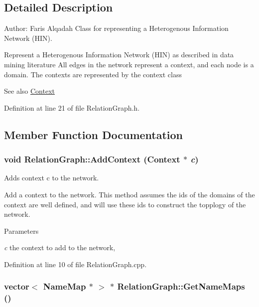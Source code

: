 \subsection{Detailed Description}
Author: Faris Alqadah Class for representing a Heterogenous Information Network (HIN).

Represent a Heterogenous Information Network (HIN) as described in data mining literature All edges in the network represent a context, and each node is a domain. The contexts are represented by the context class

\begin{DoxySeeAlso}{See also}
\hyperlink{class_context}{Context} 
\end{DoxySeeAlso}


Definition at line 21 of file RelationGraph.h.



\subsection{Member Function Documentation}
\hypertarget{class_relation_graph_a5c1bd71649ec9c19f28b3fe0abda9540}{
\subsubsection[{AddContext}]{\setlength{\rightskip}{0pt plus 5cm}void RelationGraph::AddContext ({\bf Context} $\ast$ {\em c})}}
\label{class_relation_graph_a5c1bd71649ec9c19f28b3fe0abda9540}


Adds context c to the network. 

Add a context to the network. This method assumes the ids of the domains of the context are well defined, and will use these ids to construct the topplogy of the network. 
\begin{DoxyParams}{Parameters}
\item[{\em c}]the context to add to the network, \end{DoxyParams}


Definition at line 10 of file RelationGraph.cpp.

\hypertarget{class_relation_graph_a79d93b2f1cb9226aa4a3fcbbe423588b}{
\subsubsection[{GetNameMaps}]{\setlength{\rightskip}{0pt plus 5cm}vector$<$ {\bf NameMap} $\ast$ $>$ $\ast$ RelationGraph::GetNameMaps ()}}
\label{class_relation_graph_a79d93b2f1cb9226aa4a3fcbbe423588b}


